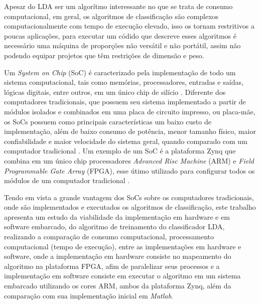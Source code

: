 Apesar do LDA ser um algorítmo interessante no que se trata de consumo computacional, em geral, os algoritmos de classificação são complexos computacionalmente com tempo de execução elevado,
isso os tornam restritivos a poucas aplicações, para executar um 
códido que descreve esses algoritmos é necessário uma máquina de proporções não versátil e não portátil,
assim não podendo equipar projetos que têm restrições de dimensão e peso.

Um \textit{System on Chip} (SoC) é caracterizado pela implementação de todo um sistema computacional, tais como memórias, processadores, entradas e saídas, lógicas digitais, entre outros, em um único chip de silício \cite{zynqBook}. Diferente dos computadores tradicionais, que possuem seu sistema implementado a partir de módulos isolados e combinados em uma placa de circuito impresso, ou placa-mãe, os SoCs possuem como principais características um baixo custo de implementação, além de baixo consumo de potência, menor tamanho físico, maior confiabilidade e maior velocidade do sistema geral, quando comparado com um computador tradicional \cite{zynqBook}. Um exemplo de um SoC é a plataforma Zynq que combina em um único chip processadores \textit{Advanced Risc Machine} (ARM) e \textit{Field Programmable Gate Array} (FPGA), esse útimo utilizado para configurar todos os módulos de um computador tradicional \cite{zynqBook}. 

Tendo em vista a grande vantagem dos SoCs sobre os computadores tradicionais, onde são implementados e executados os algoritmos de classificação, este trabalho apresenta um estudo da viabilidade da implementação em hardware e em software embarcado, do algoritmo de treinamento do classificador LDA, realizando a comparação de consumo computacional, processamento computacional (tempo de execução), entre as implementações em hardware e software, onde a implementação em hardware consiste no mapeamento do algoritmo na plataforma FPGA, afim de paralelizar seus processos e a implementação em software consiste em executar o algoritmo em um sistema embarcado utilizando os cores ARM, ambos da plataforma Zynq, além da comparação com sua implementação inicial em \textit{Matlab}.



